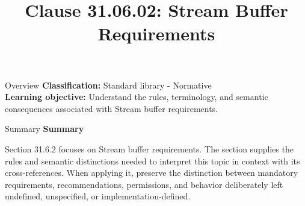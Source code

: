 \documentclass[10pt,letterpaper]{article}
\title{Clause 31.06.02: Stream Buffer Requirements}
\author{}
\date{}
\begin{document}
\maketitle
\begin{CornellOverviewBox}{Overview}
\textbf{Classification:} Standard library - Normative\\[2pt]
\textbf{Learning objective:} Understand the rules, terminology, and semantic consequences associated with Stream buffer requirements.
\end{CornellOverviewBox}\begin{CornellSummaryBox}{Summary}
{\sffamily\bfseries\color{Accent} Summary}\par\vspace{3pt}Section 31.6.2 focuses on Stream buffer requirements. The section supplies the rules and semantic distinctions needed to interpret this topic in context with its cross-references. When applying it, preserve the distinction between mandatory requirements, recommendations, permissions, and behavior deliberately left undefined, unspecified, or implementation-defined.
\end{CornellSummaryBox}
\end{document}
